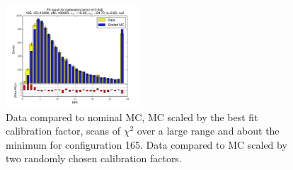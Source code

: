 \begin{figure}[htbp]
\begin{center}
\includegraphics[width=0.45\textwidth]{../FIGURES/165/FIG_Fit_result_for_calibration_factor_of_0_640.pdf} 
\caption{Data compared to nominal MC, MC scaled by the best fit calibration factor, scans of $\chi^2$ over a large range and about the minimum for configuration 165. Data compared to MC scaled by two randomly chosen calibration factors.} 
\label{tab:best_165} 
\end{center} \end{figure} 

